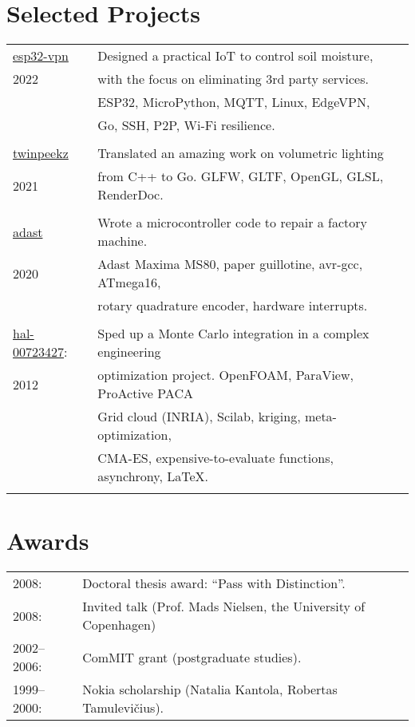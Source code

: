 \documentclass[a4paper,11pt]{article}
\begin{document}
\section*{Selected Projects}
\label{sect:pubs}

\begin{tabular}{ll}
\url{esp32-vpn} & Designed a practical IoT to control soil moisture,\\
                2022       & with the focus on eliminating 3rd party services. \\  
                       & ESP32, MicroPython, MQTT, Linux, EdgeVPN, \\
                       & Go, SSH, P2P, Wi-Fi resilience. \\
                       &\\
\url{twinpeekz}    & Translated an amazing work on volumetric lighting \\
                   2021       & from C++ to Go. GLFW, GLTF, OpenGL, GLSL, RenderDoc. \\
                          &\\
\url{adast} & Wrote a microcontroller code to repair a factory machine. \\
2020 & Adast Maxima MS80, paper guillotine, avr-gcc, ATmega16, \\
     & rotary quadrature encoder, hardware interrupts. \\
     &\\                        
\url{hal-00723427}: & Sped up a Monte Carlo integration in a complex engineering \\
                     2012             & optimization project. OpenFOAM, ParaView, ProActive PACA \\
                                  & Grid cloud (INRIA), Scilab, kriging, meta-optimization, \\
                                  & CMA-ES, expensive-to-evaluate functions, asynchrony, LaTeX. \\
                          &          
\end{tabular}

%


%
%
\section*{Awards}
%
\begin{tabular}{ll}
        2008: & Doctoral thesis award: “Pass with Distinction”.\\
        2008: & Invited talk (Prof. Mads Nielsen, the University of Copenhagen)\\
        2002--2006:& ComMIT grant (postgraduate studies).\\
        1999--2000:& Nokia scholarship (Natalia Kantola, Robertas Tamulevi\v{c}ius).
\end{tabular}
%
%

\end{document}
